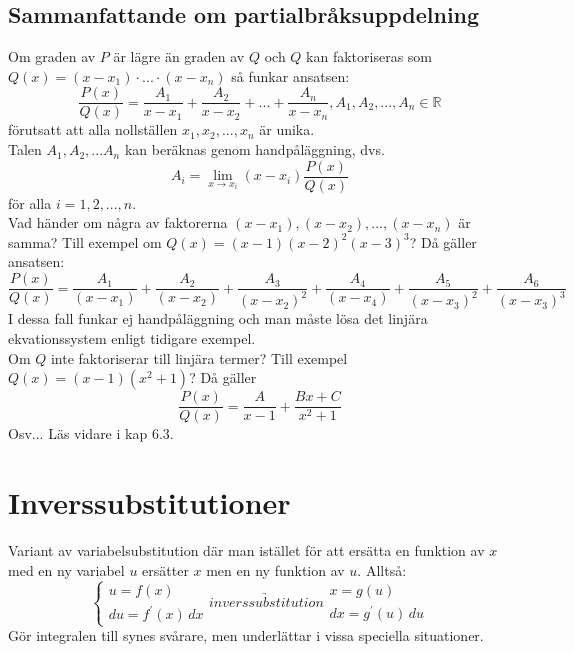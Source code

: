 \section{Sammanfattande om partialbråksuppdelning}
Om graden av $P$ är lägre än graden av $Q$ och $Q$ kan faktoriseras som \\
$Q(x)=(x-x_1)\cdot ... \cdot(x-x_n)$ så funkar ansatsen:
\begin{equation*}
    \frac{P(x)}{Q(x)}=\frac{A_1}{x-x_1}+\frac{A_2}{x-x_2}+...+\frac{A_n}{x-x_n}, A_1,A_2,...,A_n\in\mathbb{R}
\end{equation*}
förutsatt att alla nollställen $x_1,x_2,...,x_n$ är unika.\\
Talen $A_1,A_2,...A_n$ kan beräknas genom handpåläggning, dvs.
\begin{equation*}
    A_i=\lim_{x\to x_i}(x-x_i)\frac{P(x)}{Q(x)}
\end{equation*}
för alla $i=1,2,...,n$.\\
Vad händer om några av faktorerna $(x-x_1),(x-x_2),...,(x-x_n)$ är samma?
Till exempel om $Q(x)=(x-1)(x-2)^2(x-3)^3$?
Då gäller ansatsen:
\begin{equation*}
    \frac{P(x)}{Q(x)}=\frac{A_1}{(x-x_1)}+\frac{A_2}{(x-x_2)}+\frac{A_3}{(x-x_2)^2}+\frac{A_4}{(x-x_4)}+\frac{A_5}{(x-x_3)^2}+\frac{A_6}{(x-x_3)^3}
\end{equation*}
I dessa fall funkar ej handpåläggning och man måste lösa det linjära ekvationssystem enligt tidigare exempel.\\
Om $Q$ inte faktoriserar till linjära termer?
Till exempel $Q(x)=(x-1)(x^2+1)$?
Då gäller
\begin{equation*}
    \frac{P(x)}{Q(x)}=\frac{A}{x-1}+\frac{Bx+C}{x^2+1}
\end{equation*}
Osv... Läs vidare i kap 6.3.

\chapter{Inverssubstitutioner}
Variant av variabelsubstitution där man istället för att ersätta en funktion av $x$ med en ny variabel $u$ ersätter $x$ men en ny funktion av $u$.
Alltså:
\begin{equation*}
    \left\lbrace
    \begin{matrix}
        u=f(x) \\
        du=f^\prime(x)\, dx
    \end{matrix}
    \right. \underrightarrow{invers substitution}
    \begin{matrix}
        x=g(u) \\
        dx=g^\prime(u)\, du
    \end{matrix}
\end{equation*}
Gör integralen till synes svårare, men underlättar i vissa speciella situationer.

